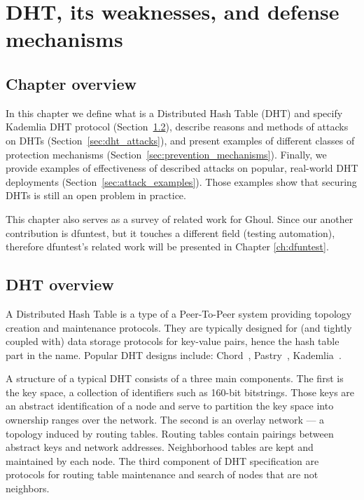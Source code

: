 \chapter{DHT, its weaknesses, and defense mechanisms}
\label{ch:threats}
\section{Chapter overview}
  In this chapter we define what is a Distributed Hash Table (DHT) and specify
  Kademlia DHT protocol (Section~\ref{sec:dht_overview}),
  describe reasons and methods of attacks on DHTs
  (Section~\ref{sec:dht_attacks}),
  and present examples of different classes of protection mechanisms
  (Section~\ref{sec:prevention_mechanisms}).
  Finally, we provide examples of effectiveness of described attacks on popular,
  real-world DHT deployments (Section~\ref{sec:attack_examples}).
  Those examples show that securing DHTs is still an open problem in practice.

  This chapter also serves as a survey of related work for Ghoul.
  Since our another contribution is dfuntest, but it touches a different field 
  (testing automation), therefore dfuntest's related work will be presented in
  Chapter \ref{ch:dfuntest}.


\section{DHT overview}
\label{sec:dht_overview}

  A Distributed Hash Table is a type of a Peer-To-Peer system providing topology
  creation and maintenance protocols.
  They are typically designed for (and tightly coupled with) data storage
  protocols for key-value pairs, hence the hash table part in the name.
  Popular DHT designs include: Chord~\cite{sto03}, Pastry~\cite{row01},
  Kademlia~\cite{may02}.

  A structure of a typical DHT consists of a three main components. The first is
  the key space, a collection of identifiers such as 160-bit bitstrings.
  Those keys are an abstract identification of a node and serve to partition the
  key space into ownership ranges over the network.
  The second is an overlay network --- a topology induced by routing tables.
  Routing tables contain pairings between abstract keys and network addresses.
  Neighborhood tables are kept and maintained by each node.
  The third component of DHT specification are protocols for routing table
  maintenance and search of nodes that are not neighbors.

